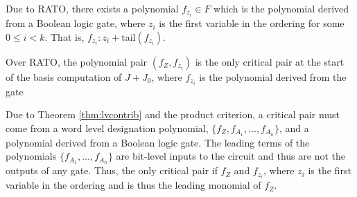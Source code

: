 Due to RATO, there exists a polynomial $f_{z_i}\in F$ which is the 
polynomial derived from a Boolean logic gate, where $z_i$ is the first 
variable in the ordering for some $0\leq i <k$. That is, $f_{z_i}: z_i+\text{tail}(f_{z_i})$.
\begin{Proposition}
Over RATO, the polynomial pair $(f_Z, f_{z_i})$ is the only critical pair
at the start of the \Grobner basis computation of $J+J_0$, where 
$f_{z_i}$ is the polynomial derived from the gate
\end{Proposition}
\begin{Proof}
Due to Theorem \ref{thm:lvcontrib} and the product criterion, 
a critical pair must come from a word level designation polynomial, 
$\{f_Z,f_{A_1},\dots,f_{A_n}\}$, and a polynomial derived from a Boolean logic
gate. The leading terms of the polynomials $\{f_{A_1},\dots,f_{A_n}\}$ are 
bit-level inputs to the circuit and thus are not the outputs of any gate.
Thus, the only critical pair if $f_Z$ and $f_{z_i}$, where $z_i$ is the first
variable in the ordering and is thus the leading monomial of $f_Z$.
\end{Proof}




